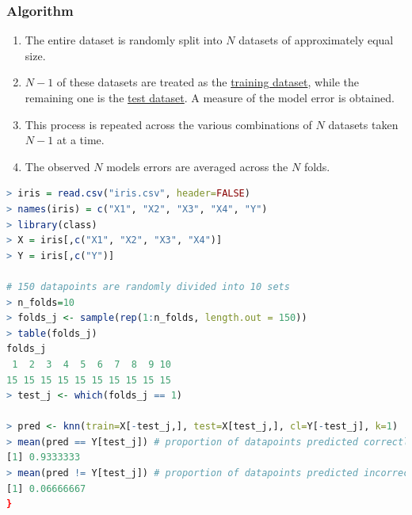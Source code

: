 \documentclass{article}
\begin{document}
\subsubsection{Algorithm}
\begin{enumerate}
    \item The entire dataset is randomly split into $N$ datasets of approximately equal size.
    \item $N-1$ of these datasets are treated as the \underline{training dataset}, while the remaining one is the \underline{test dataset}. A measure of the model error is obtained.
    \item This process is repeated across the various combinations of $N$ datasets taken $N - 1$ at a time.
    \item The observed $N$ models errors are averaged across the $N$ folds.

\end{enumerate}
\begin{lstlisting}[language=R]
> iris = read.csv("iris.csv", header=FALSE)
> names(iris) = c("X1", "X2", "X3", "X4", "Y")
> library(class)
> X = iris[,c("X1", "X2", "X3", "X4")]
> Y = iris[,c("Y")]

# 150 datapoints are randomly divided into 10 sets
> n_folds=10
> folds_j <- sample(rep(1:n_folds, length.out = 150))
> table(folds_j)
folds_j
 1  2  3  4  5  6  7  8  9 10 
15 15 15 15 15 15 15 15 15 15 
> test_j <- which(folds_j == 1)

> pred <- knn(train=X[-test_j,], test=X[test_j,], cl=Y[-test_j], k=1)
> mean(pred == Y[test_j]) # proportion of datapoints predicted correctly
[1] 0.9333333
> mean(pred != Y[test_j]) # proportion of datapoints predicted incorrectly
[1] 0.06666667
}
\end{lstlisting}
\end{document}
